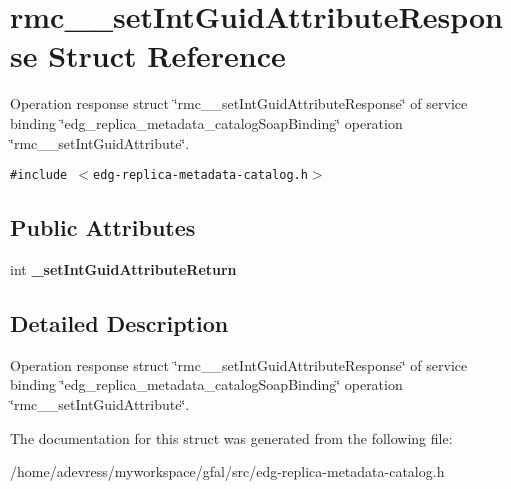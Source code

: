 \section{rmc\_\-\_\-set\-Int\-Guid\-Attribute\-Response Struct Reference}
\label{structrmc____setIntGuidAttributeResponse}
Operation response struct \char`\"{}rmc\_\-\_\-set\-Int\-Guid\-Attribute\-Response\char`\"{} of service binding \char`\"{}edg\_\-replica\_\-metadata\_\-catalog\-Soap\-Binding\char`\"{} operation \char`\"{}rmc\_\-\_\-set\-Int\-Guid\-Attribute\char`\"{}.  


{\tt \#include $<$edg-replica-metadata-catalog.h$>$}

\subsection*{Public Attributes}
\begin{CompactItemize}
\item 
int \textbf{\_\-set\-Int\-Guid\-Attribute\-Return}\label{structrmc____setIntGuidAttributeResponse_57b32762cf5b9411deaea87d0fe1d4f5}

\end{CompactItemize}


\subsection{Detailed Description}
Operation response struct \char`\"{}rmc\_\-\_\-set\-Int\-Guid\-Attribute\-Response\char`\"{} of service binding \char`\"{}edg\_\-replica\_\-metadata\_\-catalog\-Soap\-Binding\char`\"{} operation \char`\"{}rmc\_\-\_\-set\-Int\-Guid\-Attribute\char`\"{}. 



The documentation for this struct was generated from the following file:\begin{CompactItemize}
\item 
/home/adevress/myworkspace/gfal/src/edg-replica-metadata-catalog.h\end{CompactItemize}
